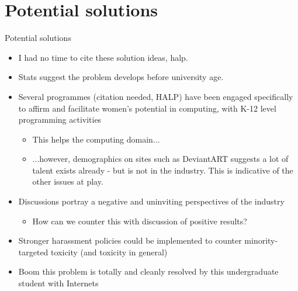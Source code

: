 \documentclass{beamer}
\begin{document}
			

\section{Potential solutions}
\begin{frame}{Potential solutions}
\begin{itemize}
	\item I had no time to cite these solution ideas, halp.
	\item Stats suggest the problem develops before university age.
	\item Several programmes (citation needed, HALP) have been engaged specifically to affirm and facilitate women's potential in computing, with K-12 level programming activities
	\begin{itemize}
		\item This helps the computing domain...
		\item ...however, demographics on sites such as DeviantART suggests a lot of talent exists already - but is not in the industry. This is indicative of the other issues at play.
	\end{itemize}
	\item Discussions portray a negative and uninviting perspectives of the industry
	\begin{itemize}
		\item How can we counter this with discussion of positive results?
	\end{itemize}
	\item Stronger harassment policies could be implemented to counter minority-targeted toxicity (and toxicity in general)
	\item Boom this problem is totally and cleanly resolved by this undergraduate student with Internets
\end{itemize}
\end{frame}
\end{document}
